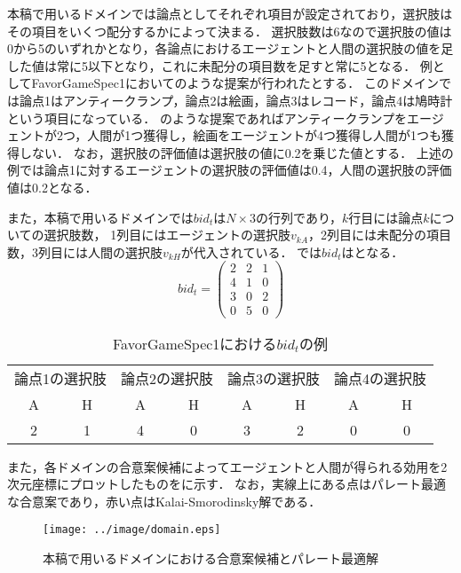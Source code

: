 本稿で用いるドメインでは論点としてそれぞれ項目が設定されており，選択肢はその項目をいくつ配分するかによって決まる．
選択肢数は6なので選択肢の値は0から5のいずれかとなり，各論点におけるエージェントと人間の選択肢の値を足した値は常に5以下となり，これに未配分の項目数を足すと常に5となる．
例としてFavorGameSpec1においてのような提案が行われたとする．
このドメインでは論点1はアンティークランプ，論点2は絵画，論点3はレコード，論点4は鳩時計という項目になっている．
のような提案であればアンティークランプをエージェントが2つ，人間が1つ獲得し，絵画をエージェントが4つ獲得し人間が1つも獲得しない．
なお，選択肢の評価値は選択肢の値に0.2を乗じた値とする．
上述の例では論点1に対するエージェントの選択肢の評価値は0.4，人間の選択肢の評価値は0.2となる．

また，本稿で用いるドメインでは$bid_t$は$N \times 3$の行列であり，$k$行目には論点$k$についての選択肢数，
1列目にはエージェントの選択肢$v_{kA}$，2列目には未配分の項目数，3列目には人間の選択肢$v_{kH}$が代入されている．
では$bid_t$はとなる．
\begin{equation}
    bid_t = \left(
    \begin{array}{rrr}
        2 & 2 & 1 \\
        4 & 1 & 0 \\
        3 & 0 & 2 \\
        0 & 5 & 0
    \end{array}
    \right)
    \label{eq:bid_ex}
\end{equation}

\begin{table}[tb]
  \centering
  \caption{FavorGameSpec1における$bid_t$の例}
  \begin{tabular}{cccccccc} \toprule
      \multicolumn{2}{c}{論点1の選択肢} & \multicolumn{2}{c}{論点2の選択肢} & \multicolumn{2}{c}{論点3の選択肢} & \multicolumn{2}{c}{論点4の選択肢} \\
      A & H & A & H & A & H & A & H \\ \midrule
      2 & 1 & 4 & 0 & 3 & 2 & 0 & 0 \\ \bottomrule
  \end{tabular}
  \label{tab:bid_ex}
\end{table}

また，各ドメインの合意案候補によってエージェントと人間が得られる効用を2次元座標にプロットしたものをに示す．
なお，実線上にある点はパレート最適な合意案であり，赤い点はKalai-Smorodinsky解である．

\begin{figure}[htb]
  \centering
  \texttt{[image: ../image/domain.eps]}
  \caption{本稿で用いるドメインにおける合意案候補とパレート最適解}
  \label{fig:domain}
\end{figure}

